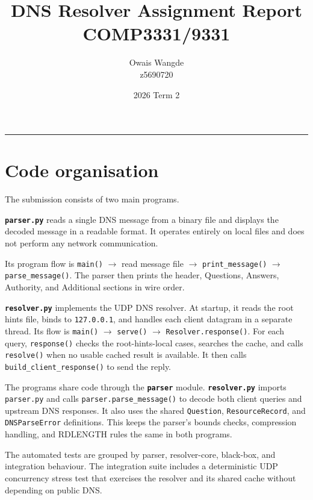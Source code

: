 \documentclass[11pt,a4paper]{article}
\title{
    \vspace{-1.5cm}
    {\Huge\bfseries\color{headingblue}
    DNS Resolver Assignment Report}
    \\[0.5em]
    {\Large COMP3331/9331}
}
\author{Owais Wangde\\z5690720}
\date{\small 2026 Term 2}
\newcommand{\code}[1]{\texttt{#1}}
\newcommand{\program}[1]{\texttt{\textbf{#1}}}
\begin{document}
\maketitle
\vspace{-1.5em}

\begin{center}
    \rule{0.82\textwidth}{0.5pt}
\end{center}

\vspace{1em}

\section{Code organisation}

The submission consists of two main programs.

\program{parser.py} reads a single DNS message from a binary file and displays
the decoded message in a readable format. It operates entirely on local files
and does not perform any network communication.

Its program flow is \code{main()} $\rightarrow$ read message file
$\rightarrow$ \code{print\_message()} $\rightarrow$ \code{parse\_message()}.
The parser then prints the header, Questions, Answers, Authority, and Additional
sections in wire order.

\program{resolver.py} implements the UDP DNS resolver. At startup, it reads the
root hints file, binds to \code{127.0.0.1}, and handles each client datagram in
a separate thread. Its flow is \code{main()} $\rightarrow$ \code{serve()}
$\rightarrow$ \code{Resolver.response()}. For each query, \code{response()}
checks the root-hints-local cases, searches the cache, and calls
\code{resolve()} when no usable cached result is available. It then calls
\code{build\_client\_response()} to send the reply.

The programs share code through the \program{parser} module. \program{resolver.py}
imports \code{parser.py} and calls \code{parser.parse\_message()} to decode both
client queries and upstream DNS responses. It also uses the shared
\code{Question}, \code{ResourceRecord}, and \code{DNSParseError} definitions.
This keeps the parser's bounds checks, compression handling, and RDLENGTH rules
the same in both programs.

The automated tests are grouped by parser, resolver-core, black-box, and
integration behaviour. The integration suite includes a deterministic UDP
concurrency stress test that exercises the resolver and its shared cache without
depending on public DNS.
\end{document}
